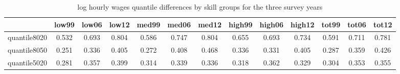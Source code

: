 \begin{table}[htbp]
\caption{\label{Tab:quantilsdesc} log hourly wages quantile differences by skill groups for the three survey years}\centering\medskip
\begin{tabular}{lcccccccccccc} \hline \hline
 & low99  & low06  & low12  & med99  & med06  & med12  & high99  & high06  & high12  & tot99  & tot06  & tot12  \\  \hline 
quantile8020 &   0.532 &   0.693 &   0.804 &   0.586 &   0.747 &   0.804 &   0.655 &   0.693 &   0.734 &   0.591 &   0.711 &   0.781 \\  
quantile8050 &   0.251 &   0.336 &   0.405 &   0.272 &   0.408 &   0.468 &   0.336 &   0.331 &   0.405 &   0.287 &   0.359 &   0.426 \\  
quantile5020 &   0.281 &   0.357 &   0.399 &   0.314 &   0.339 &   0.336 &   0.318 &   0.362 &   0.329 &   0.304 &   0.353 &   0.355 \\  
\hline \hline \end{tabular}
\end{table}
